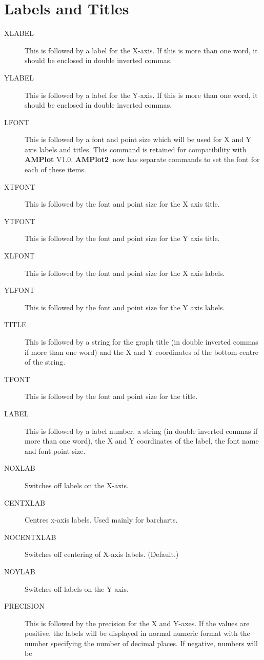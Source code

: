 \documentclass{report}
\newcommand{\amplot}{{\bf AMPlot2}}
\begin{document}
\section{Labels and Titles}
\begin{description}
\item[XLABEL] This is followed by a label for the X-axis. If this is more than 
one word, it should be enclosed in double inverted commas.
\item[YLABEL] This is followed by a label for the Y-axis. If this is more than 
one word, it should be enclosed in double inverted commas.
\item[LFONT] This is followed by a font and point size which will be used for X and Y 
axis labels and titles. This command is retained for compatibility with {\bf AMPlot} 
V1.0. \amplot\ now has separate commands to set the font for each of these items.
\item[XTFONT] This is followed by the font and point size for the X axis title.
\item[YTFONT] This is followed by the font and point size for the Y axis title.
\item[XLFONT] This is followed by the font and point size for the X axis labels.
\item[YLFONT] This is followed by the font and point size for the Y axis labels.
\item[TITLE] This is followed by a string for the graph title (in double inverted 
commas if more than one word) and the X and Y coordinates of the bottom centre of 
the string. 
\item[TFONT] This is followed by the font and point size for the title.
\item[LABEL] This is followed by a label number, a string (in double inverted 
commas if more than one word), the X and Y coordinates of the label, the font
name and font point size. 
\item[NOXLAB] Switches off labels on the X-axis.
\item[CENTXLAB] Centres x-axis labels. Used mainly for barcharts.
\item[NOCENTXLAB\dag] Switches off centering of X-axis labels. (Default.)
\item[NOYLAB] Switches off labels on the Y-axis.
\item[PRECISION] This is followed by the precision for the X and Y-axes. If the 
values are positive, the labels will be displayed in normal numeric format with the 
number specifying the number of decimal places. If negative, numbers will be 

\end{description}
\end{document}
